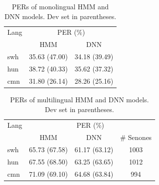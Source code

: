 \documentclass[a4paper]{article}
\begin{document}
\vspace{-0mm}
\begin{table}
\centering %
\caption{PERs of monolingual HMM and DNN models. Dev set in parentheses.}
\vspace{-3mm}
\begin{tabular}{l|c c}
   \hline
Lang  & \multicolumn{2}{c}{PER (\%)} \\
          & HMM     & DNN   \\ \hline
swh        & 35.63 (47.00)   & 34.18 (39.49)   \\
hun        & 38.72 (40.33)   & 35.62 (37.32)   \\ 
cmn        & 31.80 (26.14)   & 28.26 (25.16)   \\ \hline 
\end{tabular}
\vspace{-2mm}
\label{Tab:PER_Matched_Monolingual}
\end{table}

\begin{table}[t!]
\centering %
\caption{PERs of multilingual HMM and DNN models. Dev set in parentheses.}
\vspace{-3mm}
\begin{tabular}{l|c c c}
   \hline
Lang  & \multicolumn{3}{c}{PER (\%)} \\
          &  HMM & DNN & \# Senones   \\ \hline
swh      &65.73 (67.58)   &61.17 (63.12) & 1003 \\
hun    &67.55 (68.50)   &63.25 (63.65) &  1012 \\ 
cmn     &71.09 (69.10)   &64.68 (63.84) & 994  \\ \hline
\end{tabular}
\vspace{-2mm}
\label{Tab:PER_Mismatched_Multilingual}
\end{table}
\end{document}

